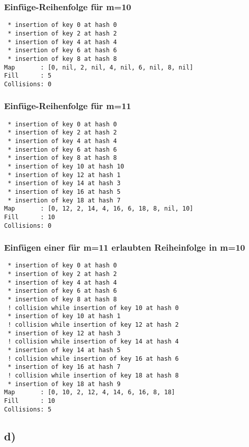 \documentclass[a4paper]{article}
\begin{document}
\subsubsection*{Einfüge-Reihenfolge für m=10}

\begin{verbatim}
 * insertion of key 0 at hash 0
 * insertion of key 2 at hash 2
 * insertion of key 4 at hash 4
 * insertion of key 6 at hash 6
 * insertion of key 8 at hash 8
Map       : [0, nil, 2, nil, 4, nil, 6, nil, 8, nil]
Fill      : 5
Collisions: 0
\end{verbatim}

\subsubsection*{Einfüge-Reihenfolge für m=11}

\begin{verbatim}
 * insertion of key 0 at hash 0
 * insertion of key 2 at hash 2
 * insertion of key 4 at hash 4
 * insertion of key 6 at hash 6
 * insertion of key 8 at hash 8
 * insertion of key 10 at hash 10
 * insertion of key 12 at hash 1
 * insertion of key 14 at hash 3
 * insertion of key 16 at hash 5
 * insertion of key 18 at hash 7
Map       : [0, 12, 2, 14, 4, 16, 6, 18, 8, nil, 10]
Fill      : 10
Collisions: 0
\end{verbatim}

\subsubsection*{Einfügen einer für m=11 erlaubten Reiheinfolge in m=10}

\begin{verbatim}
 * insertion of key 0 at hash 0
 * insertion of key 2 at hash 2
 * insertion of key 4 at hash 4
 * insertion of key 6 at hash 6
 * insertion of key 8 at hash 8
 ! collision while insertion of key 10 at hash 0
 * insertion of key 10 at hash 1
 ! collision while insertion of key 12 at hash 2
 * insertion of key 12 at hash 3
 ! collision while insertion of key 14 at hash 4
 * insertion of key 14 at hash 5
 ! collision while insertion of key 16 at hash 6
 * insertion of key 16 at hash 7
 ! collision while insertion of key 18 at hash 8
 * insertion of key 18 at hash 9
Map       : [0, 10, 2, 12, 4, 14, 6, 16, 8, 18]
Fill      : 10
Collisions: 5
\end{verbatim}

\subsection*{d)}
\end{document}
